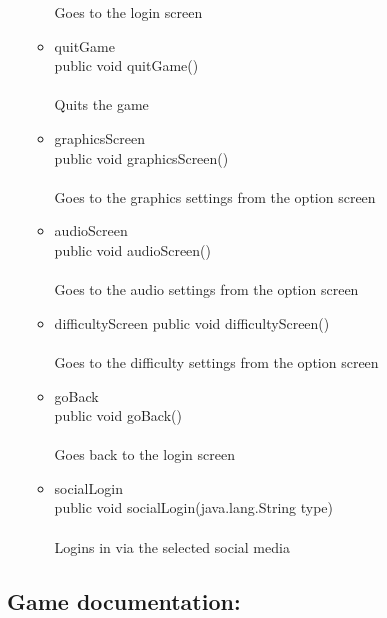 \documentclass[letterpaper]{article}
\begin{document}
\begin{itemize}
\begin{itemize}
														Goes to the login screen
												\item	quitGame \\
														public void quitGame() \\ \\
														Quits the game
												\item	graphicsScreen \\
														public void graphicsScreen() \\ \\
														Goes to the graphics settings from the option screen
												\item	audioScreen \\
														public void audioScreen() \\ \\
														Goes to the audio settings from the option screen
												\item	difficultyScreen
														public void difficultyScreen() \\ \\
														Goes to the difficulty settings from the option screen
												\item	goBack \\
														public void goBack() \\ \\
														Goes back to the login screen
												\item	socialLogin \\
														public void socialLogin(java.lang.String type) \\ \\
														Logins in via the selected social media
											\end{itemize}
								\end{itemize}
								
							\vspace{0.2in}
							\subsection*{Game documentation:}
							\vspace{0.1in}
							
\end{document}
